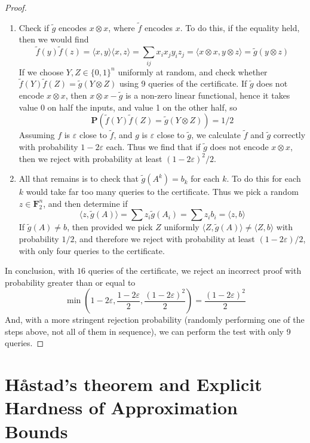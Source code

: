 \begin{proof}
\begin{enumerate}
        \item Check if $\tilde{g}$ encodes $x \otimes x$, where $\tilde{f}$ encodes $x$. To do this, if the equality held, then we would find
        \[ \tilde{f}(y) \tilde{f}(z) = \langle x, y \rangle \langle x, z \rangle = \sum_{ij} x_i x_j y_iz_j = \langle x \otimes x, y \otimes z \rangle = \tilde{g}(y \otimes z) \]
        If we choose $Y,Z \in \{ 0,1 \}^n$ uniformly at random, and check whether $\tilde{f}(Y) \tilde{f}(Z) = \tilde{g}(Y \otimes Z)$ using 9 queries of the certificate. If $\tilde{g}$ does not encode $x \otimes x$, then $x \otimes x - \tilde{g}$ is a non-zero linear functional, hence it takes value 0 on half the inputs, and value 1 on the other half, so
        \[ \mathbf{P}(\tilde{f}(Y) \tilde{f}(Z) = \tilde{g}(Y \otimes Z)) = 1/2 \]
        Assuming $f$ is $\varepsilon$ close to $\tilde{f}$, and $g$ is $\varepsilon$ close to $\tilde{g}$, we calculate $\tilde{f}$ and $\tilde{g}$ correctly with probability $1 - 2\varepsilon$ each. Thus we find that if $\tilde{g}$ does not encode $x \otimes x$, then we reject with probability at least $(1 - 2\varepsilon)^2/2$.

        \item All that remains is to check that $\tilde{g}(A^k) = b_k$ for each $k$. To do this for each $k$ would take far too many queries to the certificate. Thus we pick a random $z \in \mathbf{F}_2^n$, and then determine if
        \[ \langle z, \tilde{g}(A) \rangle = \sum z_i \tilde{g}(A_i) = \sum z_i b_i = \langle z, b \rangle \]
        If $\tilde{g}(A) \neq b$, then provided we pick $Z$ uniformly $\langle Z, \tilde{g}(A) \rangle \neq \langle Z, b \rangle$ with probability $1/2$, and therefore we reject with probability at least $(1 - 2\varepsilon)/2$, with only four queries to the certificate.
    \end{enumerate}
    In conclusion, with $16$ queries of the certificate, we reject an incorrect proof with probability greater than or equal to 
    \[ \min \left( 1 - 2 \varepsilon, \frac{1 - 2 \varepsilon}{2}, \frac{(1 - 2 \varepsilon)^2}{2} \right) = \frac{(1 - 2\varepsilon)^2}{2} \]
    And, with a more stringent rejection probability (randomly performing one of the steps above, not all of them in sequence), we can perform the test with only 9 queries.
\end{proof}

\section{Håstad's theorem and Explicit Hardness of Approximation Bounds}

